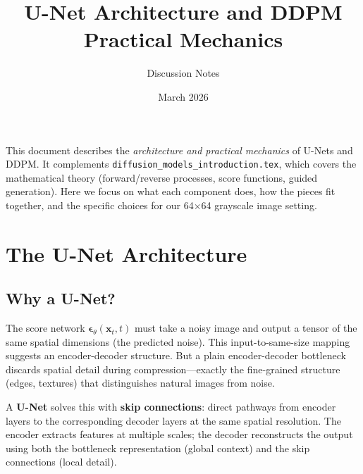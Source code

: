 \documentclass[11pt]{article}
\title{U-Net Architecture and DDPM Practical Mechanics}
\author{Discussion Notes}
\date{March 2026}
\newcommand{\xb}{\mathbf{x}}
\newcommand{\eb}{\boldsymbol{\epsilon}}
\begin{document}
\maketitle

\noindent
This document describes the \emph{architecture and practical mechanics} of U-Nets
and DDPM. It complements \texttt{diffusion\_models\_introduction.tex}, which covers
the mathematical theory (forward/reverse processes, score functions, guided generation).
Here we focus on what each component does, how the pieces fit together, and the
specific choices for our 64$\times$64 grayscale image setting.

\section{The U-Net Architecture}

\subsection{Why a U-Net?}

The score network $\eb_\theta(\xb_t, t)$ must take a noisy image and output a
tensor of the same spatial dimensions (the predicted noise). This input-to-same-size
mapping suggests an encoder-decoder structure. But a plain encoder-decoder
bottleneck discards spatial detail during compression---exactly the fine-grained
structure (edges, textures) that distinguishes natural images from noise.

A \textbf{U-Net} solves this with \textbf{skip connections}: direct pathways
from encoder layers to the corresponding decoder layers at the same spatial
resolution. The encoder extracts features at multiple scales; the decoder
reconstructs the output using both the bottleneck representation (global context)
and the skip connections (local detail).
\end{document}
